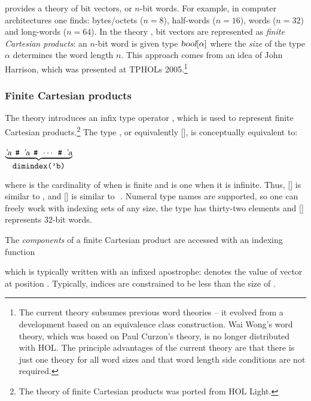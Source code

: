 {
\newcommand{\fcp}[2]{\ty{#1}[\ty{#2}]}
\newcommand{\worda}{\fcp{\bool}{\ensuremath\alpha}}
\newcommand{\wordb}{\fcp{\bool}{\ensuremath\beta}}
\newcommand{\wordc}{\fcp{\bool}{\ensuremath\gamma}}
\newcommand{\rarr}{\ensuremath\rightarrow}
\newcommand{\hash}{\,\holtxt{\#}\,}
\newcommand{\oo}[2]{\mbox{\holtxt{#1\,'\,#2}}}

\HOL{} provides a theory of bit vectors, or $n$-bit words.  For example, in computer architectures one finds:
bytes/octets ($n = 8$), half-words ($n = 16$), words ($n = 32$) and long-words
($n = 64$).  In the theory , bit vectors are represented as
\emph{finite Cartesian products}: an $n$-bit word is given type $\worda$
where the \emph{size} of the type $\alpha$ determines the word length $n$.    This
approach comes from an idea of John Harrison, which was presented at TPHOLs
2005.\footnote{The current theory subsumes previous word theories -- it evolved from a development based on an equivalence class construction.  Wai Wong's word theory, which was based on Paul Curzon's  theory, is no longer distributed with HOL.  The principle advantages of the current theory are that there is just one theory for all word sizes and that word length side conditions are not required.}

\subsubsection{Finite Cartesian products}

The \HOL{} theory  introduces an infix type operator
\holtxt{**}, which is used to represent finite Cartesian products.\footnote{The theory of
finite Cartesian products was ported from HOL Light.}  The type , or equivalently \fcp{'a}{'b}, is conceptually equivalent to:
\begin{hol}
$\underbrace{\ty{'a}\;\hash\;\ty{'a}\;\hash\;\cdots\;\hash\;\ty{'a}}_{\holtxt{dimindex('b)}}$
\end{hol}
where  is the cardinality of  when  is finite and is one when it is infinite.  Thus, \fcp{'a}{\num} is similar to , and \fcp{'a}{\bool} is similar to \hash{}.  Numeral type names are supported, so one can freely work with indexing sets of any size, \eg{} the type  has thirty-two elements and \fcp{\bool}{32} represents 32-bit words.

The \emph{components} of a finite Cartesian product are accessed with an
indexing function
which is typically written with an infixed apostrophe:
\oo{x}{i} denotes the value of vector  at position .
Typically, indices are constrained to be less than the size of .

}
